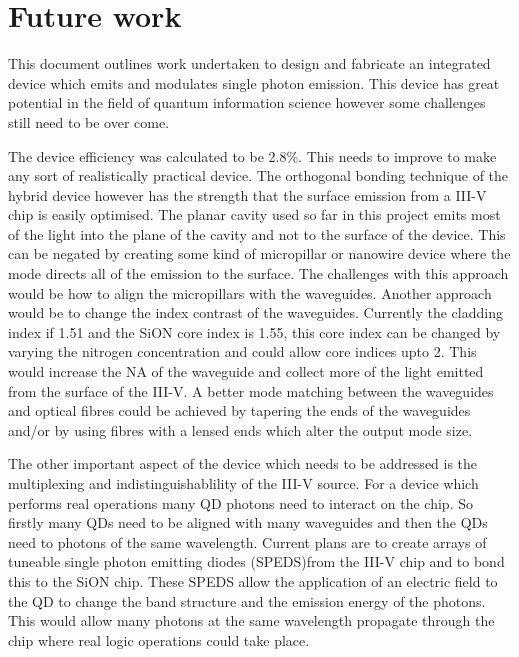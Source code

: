 
 \chapter{Future work}

This document outlines work undertaken to design and fabricate an integrated
device which emits and modulates single photon emission. This device has great
potential in the field of quantum information science however some challenges
still need to be over come.

The device efficiency was calculated to be 2.8\%. This needs to improve to make
any sort of realistically practical device. The orthogonal bonding technique of
the hybrid device however has the strength that the surface emission from a
III-V chip is easily optimised. The planar cavity used so far in this project
emits most of the light into the plane of the cavity and not to the surface of
the device. This can be negated by creating some kind of micropillar or nanowire
device where the mode directs all of the emission to the surface. The challenges
with this approach would be how to align the micropillars with the waveguides.
Another approach would be to change the index contrast of the waveguides.
Currently the cladding index if 1.51 and the SiON core index is 1.55, this core
index can be changed by varying the nitrogen concentration and could allow core
indices upto 2. This would increase the NA of the waveguide and collect more of
the light emitted from the surface of the III-V. A better mode matching between
the waveguides and optical fibres could be achieved by tapering the ends of the
waveguides and/or by using fibres with a lensed ends which alter the output mode
size.

The other important aspect of the device which needs to be addressed is the
multiplexing and indistinguishablility of the III-V source. For a device which
performs real operations many QD photons need to interact on the chip. So
firstly many QDs need to be aligned with many waveguides and then the QDs need
to photons of the same wavelength. Current plans are to create arrays of
tuneable single photon emitting diodes (SPEDS)from the III-V chip and to bond
this to the SiON chip. These SPEDS allow the application of an electric field to
the QD to change the band structure and the emission energy of the photons. This
would allow many photons at the same wavelength propagate through the chip where
real logic operations could take place. 
